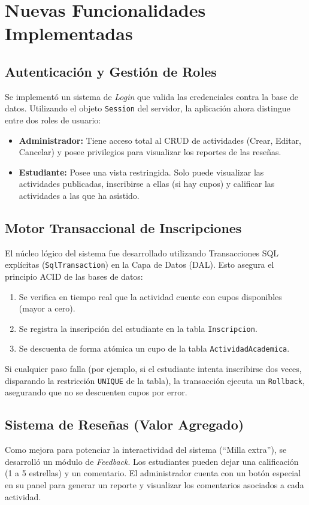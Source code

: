 \documentclass[11pt, a4paper]{article}
\begin{document}
\section{Nuevas Funcionalidades Implementadas}

\subsection{Autenticación y Gestión de Roles}
Se implementó un sistema de \textit{Login} que valida las credenciales contra la base de datos. Utilizando el objeto \texttt{Session} del servidor, la aplicación ahora distingue entre dos roles de usuario:
\begin{itemize}
    \item \textbf{Administrador:} Tiene acceso total al CRUD de actividades (Crear, Editar, Cancelar) y posee privilegios para visualizar los reportes de las reseñas.
    \item \textbf{Estudiante:} Posee una vista restringida. Solo puede visualizar las actividades publicadas, inscribirse a ellas (si hay cupos) y calificar las actividades a las que ha asistido.
\end{itemize}

\subsection{Motor Transaccional de Inscripciones}
El núcleo lógico del sistema fue desarrollado utilizando Transacciones SQL explícitas (\texttt{SqlTransaction}) en la Capa de Datos (DAL). Esto asegura el principio ACID de las bases de datos:
\begin{enumerate}
    \item Se verifica en tiempo real que la actividad cuente con cupos disponibles (mayor a cero).
    \item Se registra la inscripción del estudiante en la tabla \texttt{Inscripcion}.
    \item Se descuenta de forma atómica un cupo de la tabla \texttt{ActividadAcademica}.
\end{enumerate}
Si cualquier paso falla (por ejemplo, si el estudiante intenta inscribirse dos veces, disparando la restricción \texttt{UNIQUE} de la tabla), la transacción ejecuta un \texttt{Rollback}, asegurando que no se descuenten cupos por error.

\subsection{Sistema de Reseñas (Valor Agregado)}
Como mejora para potenciar la interactividad del sistema (``Milla extra''), se desarrolló un módulo de \textit{Feedback}. Los estudiantes pueden dejar una calificación (1 a 5 estrellas) y un comentario. El administrador cuenta con un botón especial en su panel para generar un reporte y visualizar los comentarios asociados a cada actividad.
\end{document}
